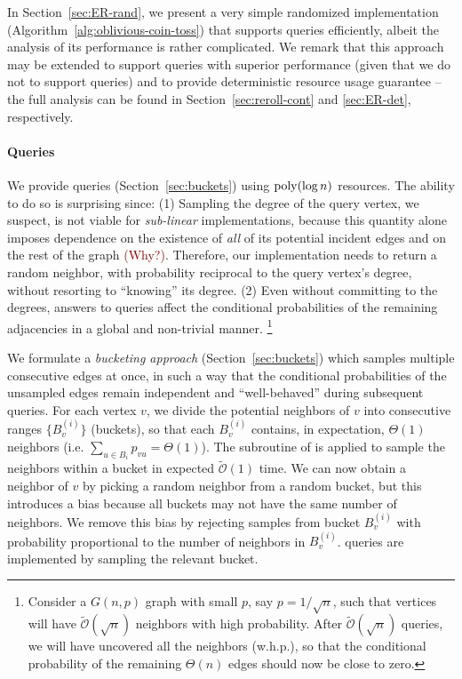 In Section~\ref{sec:ER-rand}, we present a very simple randomized implementation (Algorithm~\ref{alg:oblivious-coin-toss})
that supports  queries efficiently, albeit the analysis of its performance is rather complicated.
We remark that this approach may be extended to support  queries with superior performance
(given that we do not to support  queries) and to provide deterministic resource usage guarantee
-- the full analysis can be found in Section~\ref{sec:reroll-cont} and \ref{sec:ER-det}, respectively.


\paragraph*{ Queries}
\label{par:random_neighbor_queries}

We provide  queries (Section~\ref{sec:buckets}) using $\mathrm{poly}(\log n)$ resources.
The ability to do so is surprising since:
(1) Sampling the degree of the query vertex, we suspect, is not viable for \emph{sub-linear} implementations, because this quantity alone
imposes dependence on the existence of \emph{all} of its potential incident edges and on the rest of the graph \textcolor{Maroon}{(Why?)}.
Therefore, our implementation needs to return a random neighbor, with probability reciprocal to the query vertex's degree,
without resorting to ``knowing'' its degree.
(2) Even without committing to the degrees, answers to  queries
affect the conditional probabilities of the remaining adjacencies in a global and non-trivial manner.
\footnote{\label{conditional}Consider a $G(n,p)$ graph with small $p$, say $p = 1/\sqrt n$,
such that vertices will have $\widetilde{\mathcal{O}}(\sqrt n)$ neighbors with high probability.
After $\widetilde{\mathcal{O}}(\sqrt n)$  queries, we will have uncovered all the neighbors (w.h.p.),
so that the conditional probability of the remaining $\Theta(n)$ edges should now be close to zero.}

We formulate a \emph{bucketing approach} (Section~\ref{sec:buckets}) which samples multiple consecutive edges at once,
in such a way that the conditional probabilities of the unsampled edges remain independent and ``well-behaved'' during subsequent queries.
For each vertex $v$, we divide the potential neighbors of $v$ into consecutive ranges $\{B^{(i)}_v\}$ (buckets),
so that each $B^{(i)}_v$ contains, in expectation, $\Theta(1)$ neighbors (i.e. $\sum_{u\in B_i} p_{vu} = \Theta(1)$).
The subroutine of  is applied to sample the neighbors within a bucket in expected $\mathcal{\widetilde O}(1)$ time.
We can now obtain a neighbor of $v$ by picking a random neighbor from a random bucket,
but this introduces a bias because all buckets may not have the same number of neighbors.
We remove this bias by rejecting samples from bucket $B^{(i)}_v$ with probability proportional to the number of neighbors in $B^{(i)}_v$.
 queries are implemented by sampling the relevant bucket.




